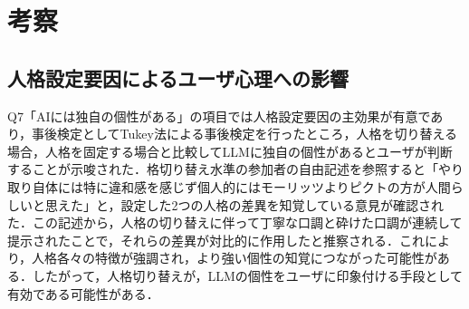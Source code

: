 \documentclass[10pt,twocolumn]{jsarticle}
\begin{document}
\section{考察}


\subsection{人格設定要因によるユーザ心理への影響}
Q7「AIには独自の個性がある」の項目では人格設定要因の主効果が有意であり，事後検定としてTukey法による事後検定を行ったところ，人格を切り替える場合，人格を固定する場合と比較してLLMに独自の個性があるとユーザが判断することが示唆された．格切り替え水準の参加者の自由記述を参照すると「やり取り自体には特に違和感を感じず個人的にはモーリッツよりピクトの方が人間らしいと思えた」と，設定した2つの人格の差異を知覚している意見が確認された．この記述から，人格の切り替えに伴って丁寧な口調と砕けた口調が連続して提示されたことで，それらの差異が対比的に作用したと推察される．これにより，人格各々の特徴が強調され，より強い個性の知覚につながった可能性がある．したがって，人格切り替えが，LLMの個性をユーザに印象付ける手段として有効である可能性がある．
\end{document}
